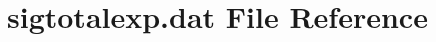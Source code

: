 \hypertarget{sigtotalexp_8dat}{}\section{sigtotalexp.\+dat File Reference}
\label{sigtotalexp_8dat}
